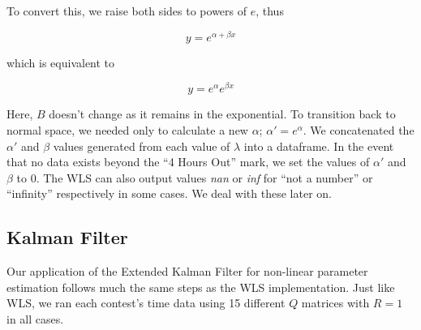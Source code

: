 To convert this, we raise both sides to powers of $e$, thus

\begin{equation}
    y = e^{\alpha + \beta x}
\end{equation}

which is equivalent to 

\begin{equation}
    y = e^{\alpha}e^{\beta x}
\end{equation}

Here, $B$ doesn't change as it remains in the exponential. To transition back to normal space, we needed only to calculate a new $\alpha$; $\alpha' = e^{\alpha}$. We concatenated the $\alpha'$ and $\beta$ values generated from each value of $\lambda$ into a dataframe. In the event that no data exists beyond the ``4 Hours Out'' mark, we set the values of $\alpha'$ and $\beta$ to 0. The WLS can also output values \textit{nan} or \textit{inf} for ``not a number'' or ``infinity'' respectively in some cases. We deal with these later on.

\subsection{Kalman Filter}
Our application of the Extended Kalman Filter for non-linear parameter estimation follows much the same steps as the WLS implementation. Just like WLS, we ran each contest's time data using 15 different $Q$ matrices with $R = 1$ in all cases. 

